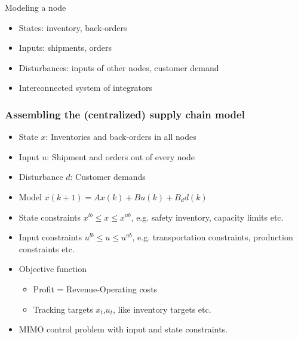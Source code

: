 \documentclass[table]{beamer}
\begin{document}
\begin{frame}{Modeling a node}
 \begin{figure}
  \centering      
  \huge{\resizebox{0.65\textwidth}{!}{}}
 \end{figure}
 \begin{itemize}
  \item States: inventory, back-orders
  \item Inputs: shipments, orders
  \item Disturbances: inputs of other nodes, customer demand
  \item \alert{Interconnected system of integrators}
 \end{itemize} 
\end{frame}

\begin{frame}
\frametitle{Assembling the (centralized) supply chain model}
\begin{itemize}
\item State $x$: Inventories and back-orders in all nodes
\item Input $u$: Shipment and orders out of every node
\item Disturbance $d$: Customer demands
\item Model $x(k+1) = Ax(k) + Bu(k) + B_dd(k)$
\item State constraints $x^{lb} \leq x \leq x^{ub}$, e.g.  safety
  inventory, capacity limits etc.
\item Input constraints $u^{lb} \leq u \leq u^{ub}$, e.g. transportation constraints, production constraints etc.
\item Objective function
 \begin{itemize}
   \item Profit = Revenue-Operating costs
   \item Tracking targets $x_t$,$u_t$, like  inventory targets etc.
\end{itemize}
\item \alert{ MIMO control problem with input and state constraints.}
\end{itemize}
\end{frame}
\end{document}
